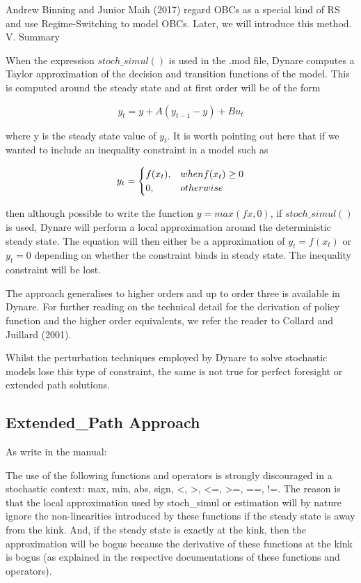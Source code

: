 \documentclass[10pt,math=newtx,citestyle=gb7714-2015,bibstyle=gb7714-2015]{elegantbook}
\begin{document}
{\begin{itemize}
\end{itemize}

Andrew Binning and Junior Maih (2017) regard OBCs as a special kind of RS and use Regime-Switching to model OBCs. Later, we will introduce this method.
V. Summary

When the expression $stoch\_simul()$ is used in the .mod file, Dynare computes a Taylor approximation of the decision and transition functions of the model. This is computed around the steady state and at first order will be of the form

$$y_t=y+A(y_{t-1}-y)+Bu_t$$

where y is the steady state value of $y_t$. It is worth pointing out here that if we wanted to include an inequality constraint in a model such as

\begin{equation*}
	y_t=
	\begin{cases}
		f(x_t),& when f(x_t)\ge0\\
		0,\space &otherwise
	\end{cases}
\end{equation*}

then although possible to write the function $y = max(fx,0)$, if $stoch\_simul()$ is used, Dynare will perform a local approximation around the deterministic steady state. The equation will then either be a approximation of $y_t = f(x_t)$ or $y_t = 0$ depending on whether the constraint binds in steady state. The inequality constraint will be lost.

The approach generalises to higher orders and up to order three is available in Dynare. For further reading on the technical detail for the derivation of policy function and the higher order equivalents, we refer the reader to Collard and Juillard (2001).

Whilst the perturbation techniques employed by Dynare to solve stochastic models lose this type of constraint, the same is not true for perfect foresight or extended path solutions.


\subsection{Extended\_Path Approach}

As write in the manual:

The use of the following functions and operators is strongly discouraged in a stochastic context: max, min, abs, sign, <, >, <=, >=, ==, !=. The reason is that the local approximation used by stoch\_simul or estimation will by nature ignore the non-linearities introduced by these functions if the steady state is away from the kink. And, if the steady state is exactly at the kink, then the approximation will be bogus because the derivative of these functions at the kink is bogus (as explained in the respective documentations of these functions and operators).

}
\end{document}
